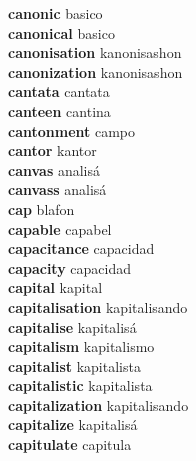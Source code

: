 \textbf{canonic } basico \\
\textbf{canonical } basico \\
\textbf{canonisation } kanonisashon \\
\textbf{canonization } kanonisashon \\
\textbf{cantata } cantata \\
\textbf{canteen } cantina \\
\textbf{cantonment } campo \\
\textbf{cantor } kantor \\
\textbf{canvas } analisá \\
\textbf{canvass } analisá \\
\textbf{cap } blafon \\
\textbf{capable } capabel \\
\textbf{capacitance } capacidad \\
\textbf{capacity } capacidad \\
\textbf{capital } kapital \\
\textbf{capitalisation } kapitalisando \\
\textbf{capitalise } kapitalisá \\
\textbf{capitalism } kapitalismo \\
\textbf{capitalist } kapitalista \\
\textbf{capitalistic } kapitalista \\
\textbf{capitalization } kapitalisando \\
\textbf{capitalize } kapitalisá \\
\textbf{capitulate } capitula \\
